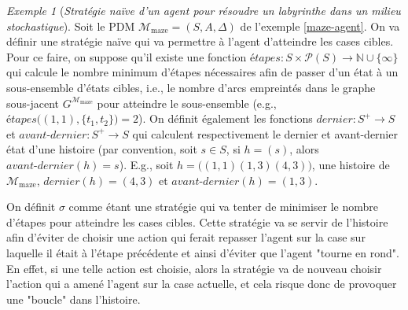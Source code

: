 \documentclass[12pt,a4paper]{report}
\theoremstyle{definition}%
\theoremstyle{remark}
\newtheorem{example}{Exemple}[chapter]
\begin{document}
\begin{example}[\textit{Stratégie naïve d'un agent pour résoudre un labyrinthe dans un milieu stochastique}] \label{example-strat-history}
	Soit le PDM $\mathcal{M}_{\text{maze}} = (S, A, \Delta)$ de l'exemple
	\ref{maze-agent}.	On va définir une stratégie naïve qui va permettre à l'agent d'atteindre les cases cibles.
	Pour ce faire, on suppose qu'il existe une fonction $\textit{étapes} : S \times \mathcal{P}(S) \rightarrow \mathbb{N} \cup \{ \infty \}$ qui calcule le
	nombre minimum d'étapes nécessaires afin de passer d'un état à un sous-ensemble d'états cibles, i.e., le nombre d'arcs empreintés dans le graphe sous-jacent $G^{\mathcal{M}_{\text{maze}}}$ pour atteindre le sous-ensemble (e.g., $\textit{étapes}\big((1,1), \{t_1, t_2\}\big) = 2$).
	On définit également les fonctions $dernier : S^+ \rightarrow S$ et $avant\text{-}dernier: S^+ \rightarrow S$
	qui calculent respectivement le dernier et avant-dernier état d'une
	histoire (par convention, soit $s \in S$, si $h = (s)$, alors $\textit{avant-dernier}(h) = s$). E.g., soit $h = \big((1, 1) (1, 3) (4, 3)\big)$, une histoire de
  $\mathcal{M}_{\text{maze}}$, $dernier(h) = (4, 3)$ et $avant\text{-}dernier(h) = (1,3)$. \par
	On définit $\sigma$ comme étant une stratégie qui va tenter de
	minimiser le nombre d'étapes pour atteindre
	les cases cibles. Cette stratégie va se servir de l'histoire afin d'éviter de choisir une action qui ferait repasser l'agent
	sur la case sur laquelle il était à l'étape précédente
	et ainsi d'éviter que l'agent "tourne en rond".
	En effet, si une telle action est
	choisie, alors la stratégie va de nouveau choisir l'action qui a amené
	l'agent sur la case actuelle, et cela risque donc de provoquer une "boucle"
	dans l'histoire.
%


\end{example}
\end{document}
